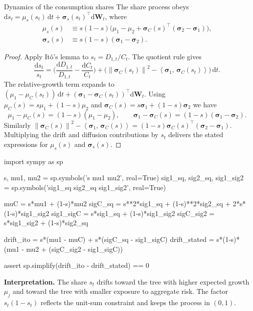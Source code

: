 ﻿\documentclass[11pt,letterpaper,oneside]{article}
\numberwithin{equation}{section}
\newcommand{\1}{\mathbf{1}}
\newcommand{\diff}{\mathrm{d}}
\newcommand{\norm}[1]{\left\lVert #1\right\rVert}
\newcommand{\ip}[2]{\left\langle #1,\,#2\right\rangle}
\begin{document}
\begin{lemma}{Dynamics of the consumption share}{s}
The share process obeys $\diff s_t = \mu_s(s_t)\,\diff t + \bm{\sigma}_s(s_t)^{\top}\diff\bm{W}_t$, where
\begin{align}
  \mu_s(s) &\equiv s(1-s)\Big(\mu_1-\mu_2+\bm{\sigma}_C(s)^{\top}(\bm{\sigma}_2-\bm{\sigma}_1)\Big), \\
  \bm{\sigma}_s(s) &\equiv s(1-s)(\bm{\sigma}_1-\bm{\sigma}_2).
  \label{eq:s_drift}
\end{align}
\end{lemma}
\begin{proof}
Apply It\^o's lemma to $s_t = D_{1,t}/C_t$. The quotient rule gives
\[
  \frac{\diff s_t}{s_t} = \Big(\frac{\diff D_{1,t}}{D_{1,t}}-\frac{\diff C_t}{C_t}\Big) + \Big(\norm{\bm{\sigma}_C(s_t)}^2 - \ip{\bm{\sigma}_1}{\bm{\sigma}_C(s_t)}\Big)\,\diff t.
\]
The relative-growth term expands to $(\mu_1-\mu_C(s_t))\,\diff t + (\bm{\sigma}_1-\bm{\sigma}_C(s_t))^{\top}\diff\bm{W}_t$. Using $\mu_C(s) = s\mu_1 + (1-s)\mu_2$ and $\bm{\sigma}_C(s) = s\bm{\sigma}_1 + (1-s)\bm{\sigma}_2$ we have
\[
  \mu_1-\mu_C(s) = (1-s)(\mu_1-\mu_2),
  \qquad
  \bm{\sigma}_1-\bm{\sigma}_C(s) = (1-s)(\bm{\sigma}_1-\bm{\sigma}_2).
\]
Similarly $\norm{\bm{\sigma}_C(s)}^2 - \ip{\bm{\sigma}_1}{\bm{\sigma}_C(s)} = (1-s)\bm{\sigma}_C(s)^{\top}(\bm{\sigma}_2-\bm{\sigma}_1)$. Multiplying the drift and diffusion contributions by $s_t$ delivers the stated expressions for $\mu_s(s)$ and $\bm{\sigma}_s(s)$.
\end{proof}

\begin{sympycheck}[title={Verification: Share dynamics}]
\begin{pyconsole}
import sympy as sp

s, mu1, mu2 = sp.symbols('s mu1 mu2', real=True)
sig1_sq, sig2_sq, sig1_sig2 = sp.symbols('sig1_sq sig2_sq sig1_sig2', real=True)

muC = s*mu1 + (1-s)*mu2
sigC_sq = s**2*sig1_sq + (1-s)**2*sig2_sq + 2*s*(1-s)*sig1_sig2
sig1_sigC = s*sig1_sq + (1-s)*sig1_sig2
sigC_sig2 = s*sig1_sig2 + (1-s)*sig2_sq

drift_ito = s*(mu1 - muC) + s*(sigC_sq - sig1_sigC)
drift_stated = s*(1-s)*(mu1 - mu2 + (sigC_sig2 - sig1_sigC))

assert sp.simplify(drift_ito - drift_stated) == 0
\end{pyconsole}
\end{sympycheck}

\begin{tcolorbox}[didacticstyle]
\textbf{Interpretation.} The share $s_t$ drifts toward the tree with higher expected growth $\mu_j$ and toward the tree with smaller exposure to aggregate risk. The factor $s_t(1-s_t)$ reflects the unit-sum constraint and keeps the process in $(0,1)$.
\end{tcolorbox}
\end{document}
